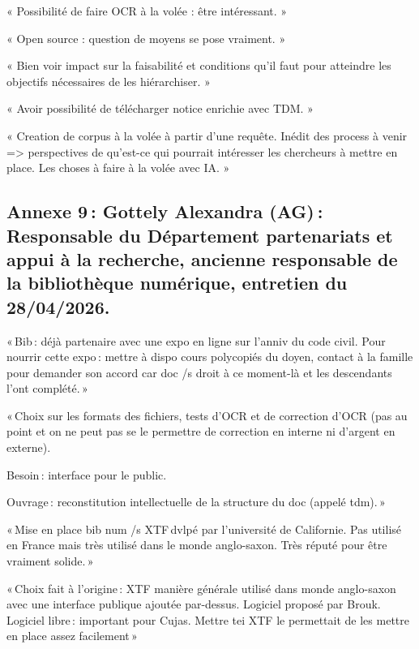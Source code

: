 « Possibilité de faire OCR à la volée : être intéressant. » 

« Open source : question de moyens se pose vraiment. » 

« Bien voir impact sur la faisabilité et conditions qu’il faut pour atteindre les objectifs nécessaires de les hiérarchiser. » 

« Avoir possibilité de télécharger notice enrichie avec TDM. » 

« Creation de corpus à la volée à partir d’une requête. Inédit des process à venir => perspectives de qu’est-ce qui pourrait intéresser les chercheurs à mettre en place. Les choses à faire à la volée avec IA. » 



\subsection*{Annexe 9 : Gottely Alexandra (AG) : Responsable du Département partenariats et appui à la recherche, ancienne responsable de la bibliothèque numérique, entretien du 28/04/2026.}


« Bib : déjà partenaire avec une expo en ligne sur l’anniv du code civil. Pour nourrir cette expo : mettre à dispo cours polycopiés du doyen, contact à la famille pour demander son accord car doc /s droit à ce moment-là et les descendants l’ont complété. » 

« Choix sur les formats des fichiers, tests d’OCR et de correction d’OCR (pas au point et on ne peut pas se le permettre de correction en interne ni d’argent en externe).  

Besoin : interface pour le public.  

Ouvrage : reconstitution intellectuelle de la structure du doc (appelé tdm). » 

« Mise en place bib num /s XTF dvlpé par l’université de Californie. Pas utilisé en France mais très utilisé dans le monde anglo-saxon. Très réputé pour être vraiment solide. » 

« Choix fait à l’origine : XTF manière générale utilisé dans monde anglo-saxon avec une interface publique ajoutée par-dessus. Logiciel proposé par Brouk.  Logiciel libre : important pour Cujas. Mettre tei XTF le permettait de les mettre en place assez facilement » 


